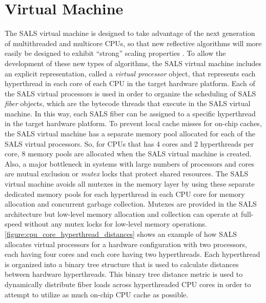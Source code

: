 \section{Virtual Machine}

The SALS virtual machine is designed to take advantage of the next
generation of multithreaded and multicore CPUs, so that new reflective
algorithms will more easily be designed to exhibit ``strong'' scaling
properties \cite[]{sodan:2010}.  To allow the development of these new
types of algorithms, the SALS virtual machine includes an explicit
representation, called a {\emph{virtual processor}} object, that
represents each hyperthread in each core of each CPU in the target
hardware platform.  Each of the SALS virtual processors is used in
order to organize the scheduling of SALS {\emph{fiber}} objects, which
are the bytecode threads that execute in the SALS virtual machine.  In
this way, each SALS fiber can be assigned to a specific hyperthread in
the target hardware platform.  To prevent local cache misses for
on-chip caches, the SALS virtual machine has a separate memory pool
allocated for each of the SALS virtual processors.  So, for CPUs that
has 4 cores and 2 hyperthreads per core, 8 memory pools are allocated
when the SALS virtual machine is created.  Also, a major bottleneck in
systems with large numbers of processors and cores are mutual
exclusion or {\emph{mutex}} locks that protect shared resources.  The
SALS virtual machine avoids all mutexes in the memory layer by using
these separate dedicated memory pools for each hyperthread in each CPU
core for memory allocation and concurrent garbage collection.  Mutexes
are provided in the SALS architecture but low-level memory allocation
and collection can operate at full-speed without any mutex locks for
low-level memory operations.
{\mbox{\autoref{figure:cpu_core_hyperthread_distances}}} shows an
example of how SALS allocates virtual processors for a hardware
configuration with two processors, each having four cores and each
core having two hyperthreads.  Each hyperthread is organized into a
binary tree structure that is used to calculate distances between
hardware hyperthreads.  This binary tree distance metric is used to
dynamically distribute fiber loads across hyperthreaded CPU cores in
order to attempt to utilize as much on-chip CPU cache as possible.
